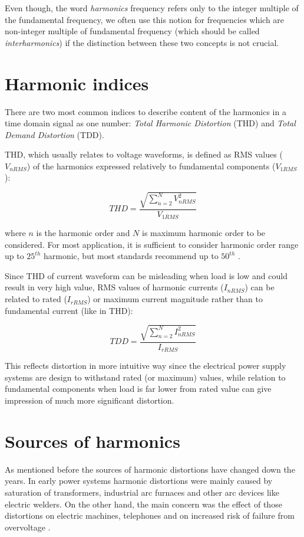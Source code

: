 \documentclass[12pt]{report} %
\begin{document}
Even though, the word \textit{harmonics} frequency refers only to the integer multiple of the fundamental frequency, we often use this notion for frequencies which are non-integer multiple of fundamental frequency (which should be called \textit{interharmonics}) if the distinction between these two concepts is not crucial.

\section{Harmonic indices}
There are two most common indices to describe content of the harmonics in a time domain signal as one number: \textit{Total Harmonic Distortion} (THD) and \textit{Total Demand Distortion} (TDD). 

THD, which usually relates to voltage waveforms, is defined as RMS values ($V_{n RMS}$) of the harmonics expressed relatively to fundamental components ($V_{1 RMS}$):

\begin{equation}
	THD = \frac{\sqrt{\sum_{n=2}^{N} V_{n RMS}^2}}{V_{1RMS}}
\end{equation}

where $n$ is the harmonic order and $N$ is maximum harmonic order to be considered. For most application, it is sufficient to consider harmonic order range up to $25^{th}$ harmonic, but most standards recommend up to $50^{th}$ \cite{das}.

Since THD of current waveform can be misleading when load is low and could result in very high value, RMS values of harmonic currents ($I_{nRMS}$) can be related to rated ($I_{rRMS}$) or maximum current magnitude rather than to fundamental current (like in THD):

\begin{equation}
	TDD = \frac{\sqrt{\sum_{n=2}^{N} I_{nRMS}^2}}{I_{rRMS}}
\end{equation}

This reflects distortion in more intuitive way since the electrical power supply systems are design to withstand rated (or maximum) values, while relation to fundamental components when load is far lower from rated value can give impression of much more significant distortion.

\section{Sources of harmonics}
As mentioned before the sources of harmonic distortions have changed down the years. In early power systems harmonic distortions were mainly caused by saturation of transformers, industrial arc furnaces and other arc devices like electric welders. On the other hand, the main concern was the effect of those distortions on electric machines, telephones and on increased risk of failure from overvoltage \cite{rosa}.
\end{document}
